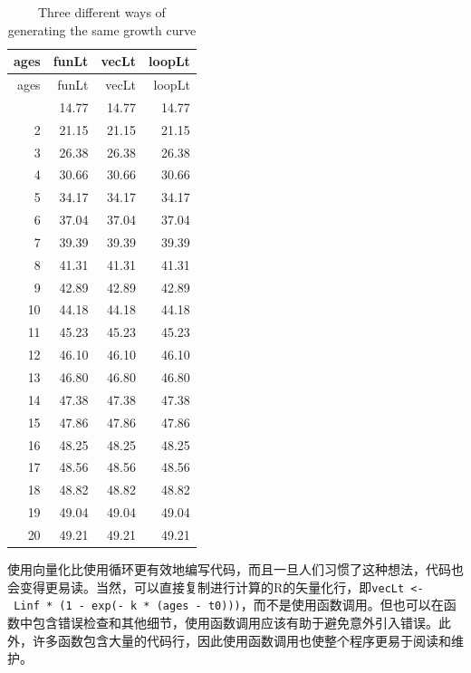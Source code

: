 \documentclass[
  lang=cn,
  11pt,
  scheme=chinese,
  chinesefont=nofont,
  citestyle=gb7714-2015,
  bibstyle=gb7714-2015]{elegantbook}
\begin{document}
\begin{longtable}[]{@{}rrrr@{}}
\caption{\label{tab:table1}Three different ways of generating the same growth curve}\tabularnewline
\toprule\noalign{}
ages & funLt & vecLt & loopLt \\
\midrule\noalign{}
\endfirsthead
\toprule\noalign{}
ages & funLt & vecLt & loopLt \\
\midrule\noalign{}
\endhead
\bottomrule\noalign{}
\endlastfoot
1 & 14.77 & 14.77 & 14.77 \\
2 & 21.15 & 21.15 & 21.15 \\
3 & 26.38 & 26.38 & 26.38 \\
4 & 30.66 & 30.66 & 30.66 \\
5 & 34.17 & 34.17 & 34.17 \\
6 & 37.04 & 37.04 & 37.04 \\
7 & 39.39 & 39.39 & 39.39 \\
8 & 41.31 & 41.31 & 41.31 \\
9 & 42.89 & 42.89 & 42.89 \\
10 & 44.18 & 44.18 & 44.18 \\
11 & 45.23 & 45.23 & 45.23 \\
12 & 46.10 & 46.10 & 46.10 \\
13 & 46.80 & 46.80 & 46.80 \\
14 & 47.38 & 47.38 & 47.38 \\
15 & 47.86 & 47.86 & 47.86 \\
16 & 48.25 & 48.25 & 48.25 \\
17 & 48.56 & 48.56 & 48.56 \\
18 & 48.82 & 48.82 & 48.82 \\
19 & 49.04 & 49.04 & 49.04 \\
20 & 49.21 & 49.21 & 49.21 \\
\end{longtable}

使用向量化比使用循环更有效地编写代码，而且一旦人们习惯了这种想法，代码也会变得更易读。当然，可以直接复制进行计算的R的矢量化行，即\texttt{vecLt\ \textless{}-\ Linf\ *\ (1\ -\ exp(-\ k\ *\ (ages\ -\ t0)))}，而不是使用函数调用。但也可以在函数中包含错误检查和其他细节，使用函数调用应该有助于避免意外引入错误。此外，许多函数包含大量的代码行，因此使用函数调用也使整个程序更易于阅读和维护。
\end{document}
